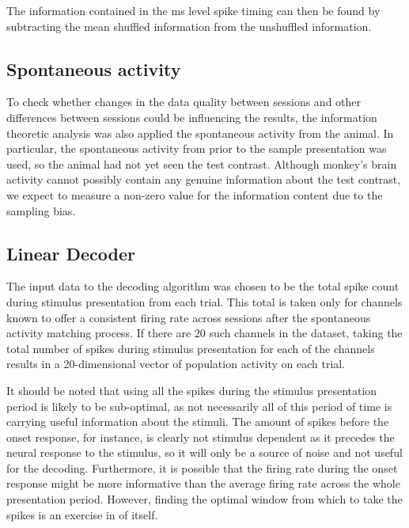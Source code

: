 The information contained in the \unit[4]{ms} level spike timing can then be found by subtracting the mean shuffled information from the unshuffled information.

\FloatBarrier
\subsection{Spontaneous activity}

To check whether changes in the data quality between sessions and other differences between sessions could be influencing the results, the information theoretic analysis was also applied the spontaneous activity from the animal.
In particular, the spontaneous activity from prior to the sample presentation was used, so the animal had not yet seen the test contrast.
Although monkey's brain activity cannot possibly contain any genuine information about the test contrast, we expect to measure a non-zero value for the information content due to the sampling bias.

\subsection{Linear Decoder}
\label{sec:dec-meth-lin}

The input data to the decoding algorithm was chosen to be the total spike count during stimulus presentation from each trial.
This total is taken only for channels known to offer a consistent firing rate across sessions after the spontaneous activity matching process.
If there are 20 such channels in the dataset, taking the total number of spikes during stimulus presentation for each of the channels results in a 20-dimensional vector of population activity on each trial.

It should be noted that using all the spikes during the stimulus presentation period is likely to be sub-optimal, as not necessarily all of this period of time is carrying useful information about the stimuli.
The amount of spikes before the onset response, for instance, is clearly not stimulus dependent as it precedes the neural response to the stimulus, so it will only be a source of noise and  not useful for the decoding.
Furthermore, it is possible that the firing rate during the onset response might be more informative than the average firing rate across the whole presentation period.
However, finding the optimal window from which to take the spikes is an exercise in of itself.

